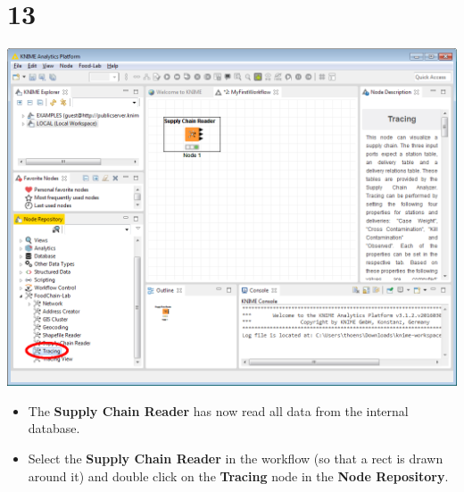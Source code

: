 \documentclass[10pt]{beamer}
\begin{document}
\section{13}
\begin{frame}
	\begin{center}
  		\includegraphics[height=0.6\textheight]{13.png}
	\end{center}
	\begin{itemize}
		\item The \textbf{Supply Chain Reader} has now read all data from the internal database.
		\item Select the \textbf{Supply Chain Reader} in the workflow (so that a rect is drawn around it) and double click on the \textbf{Tracing} node in the \textbf{Node Repository}.
	\end{itemize}
\end{frame}
\end{document}
